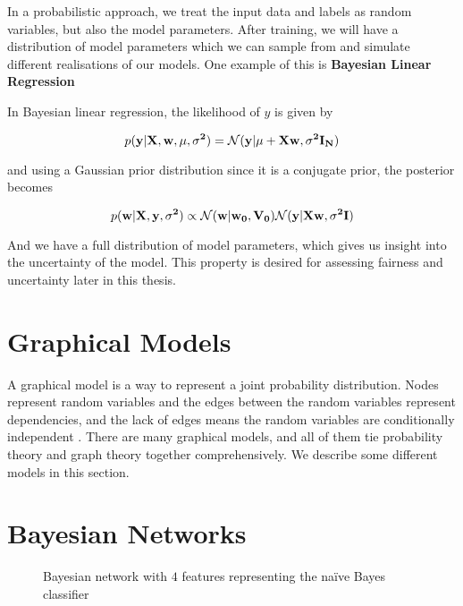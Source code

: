 In a probabilistic approach, we treat the input data and labels as random variables, but also the model parameters. After training, we will have a distribution of model parameters which we can sample from and simulate different realisations of our models. One example of this is \textbf{Bayesian Linear Regression}

In Bayesian linear regression, the likelihood of $y$ is given by \cite[p.~232]{Murphy:2012:Book}

\begin{equation*}
    p(\bf{y}|\bf{X}, \bf{w}, \mu, \sigma^2) = \mathcal{N}(\bf{y}|\mu + \bf{X}\bf{w}, \sigma^2 \bf{I}_N)
\end{equation*}

and using a Gaussian prior distribution since it is a conjugate prior, the posterior becomes \cite[p.~232]{Murphy:2012:Book}

\begin{equation*}
    p(\bf{w}|\bf{X}, \bf{y}, \sigma^2) \propto \mathcal{N}(\bf{w}|\bf{w_0}, \bf{V_0}) \mathcal{N}(\bf{y}|\bf{Xw}, \sigma^2\bf{I})
\end{equation*}

And we have a full distribution of model parameters, which gives us insight into the uncertainty of the model. This property is desired for assessing fairness and uncertainty later in this thesis.

\section{Graphical Models}

A graphical model is a way to represent a joint probability distribution. Nodes represent random variables and the edges between the random variables represent dependencies, and the lack of edges means the random variables are conditionally independent \cite[p.~308]{Murphy:2012:Book}. There are many graphical models, and all of them tie probability theory and graph theory together comprehensively. We describe some different models in this section.

\section{Bayesian Networks}

\begin{figure}[h!]
    \centering
    \caption{Bayesian network with $4$ features representing the naïve Bayes classifier}
    \label{fig:my_label}
\end{figure}

